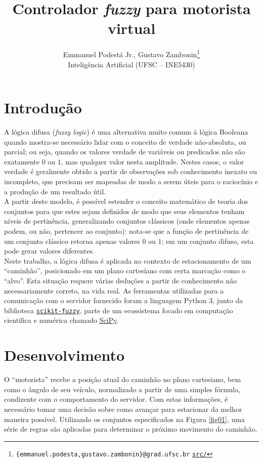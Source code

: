 \documentclass{article}
\title{\textbf{Controlador \emph{fuzzy} para motorista virtual}}
\author{Emmanuel Podestá Jr., Gustavo Zambonin\thanks{
        \texttt{\{emmanuel.podesta,gustavo.zambonin\}@grad.ufsc.br} \hfill
        \texttt{\href{https://github.com/zambonin/ufsc-ine5430}{src/}}
    } \\
    \small{Inteligência Artificial (UFSC -- INE5430)}
}
\date{}
\begin{document}
\maketitle

\section{Introdução}

A lógica difusa (\emph{fuzzy logic}) é uma alternativa muito comum à lógica
Booleana quando mostra-se necessário lidar com o conceito de verdade
não-absoluta, ou parcial; ou seja, quando os valores verdade de variáveis ou
predicados não são exatamente $0$ ou $1$, mas qualquer valor nesta amplitude.
Nestes casos, o valor verdade é geralmente obtido a partir de observações sob
conhecimento inexato ou incompleto, que precisam ser mapeadas de modo a serem
úteis para o raciocínio e a produção de um resultado útil. \\

A partir deste modelo, é possível estender o conceito matemático de teoria dos
conjuntos para que estes sejam definidos de modo que seus elementos tenham
níveis de pertinência, generalizando conjuntos clássicos (onde elementos apenas
podem, ou não, pertencer ao conjunto): nota-se que a função de pertinência de
um conjunto clássico retorna apenas valores $0$ ou $1$; em um conjunto difuso,
esta pode gerar valores diferentes. \\

Neste trabalho, a lógica difusa é aplicada no contexto de estacionamento de um
``caminhão'', posicionado em um plano cartesiano com certa marcação como o
``alvo''. Esta situação requere várias deduções a partir de conhecimento
não necessariamente correto, na vida real. As ferramentas utilizadas para a
comunicação com o servidor fornecido foram a linguagem Python 3, junto da
biblioteca
\href{https://github.com/scikit-fuzzy/scikit-fuzzy}{\texttt{scikit-fuzzy}},
parte de um ecossistema focado em computação científica e
numérica chamado \href{https://scipy.org}{SciPy}.

\section{Desenvolvimento}

O ``motorista'' recebe a posição atual do caminhão no plano cartesiano, bem como
o ângulo de seu veículo, normalizado a partir de uma simples fórmula, condizente
com o comportamento do servidor. Com estas informações, é necessário tomar uma
decisão sobre como avançar para estacionar da melhor maneira possível.
Utilizando os conjuntos especificados na Figura \ref{fig01}, uma série de regras
são aplicadas para determinar o próximo movimento do caminhão. \\
\end{document}
